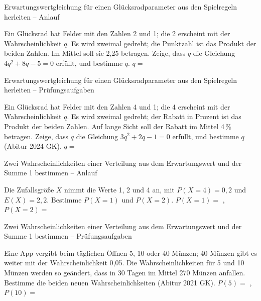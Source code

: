 \begin{aufgabe}{Erwartungswertgleichung für einen Glücksradparameter aus den Spielregeln herleiten – Anlauf}
\begin{teile}
\teil Ein Glücksrad hat Felder mit den Zahlen 2 und 1; die 2 erscheint mit der Wahrscheinlichkeit $q$. Es wird zweimal gedreht; die Punktzahl ist das Produkt der beiden Zahlen. Im Mittel soll sie 2{,}25 betragen. Zeige, dass $q$ die Gleichung $4q^2 + 8q - 5 = 0$ erfüllt, und bestimme $q$. $q = $ \leerfeld
\end{teile}
\end{aufgabe}

\begin{aufgabe}{Erwartungswertgleichung für einen Glücksradparameter aus den Spielregeln herleiten – Prüfungsaufgaben}
\begin{teile}
\teil Ein Glücksrad hat Felder mit den Zahlen 4 und 1; die 4 erscheint mit der Wahrscheinlichkeit $q$. Es wird zweimal gedreht; der Rabatt in Prozent ist das Produkt der beiden Zahlen. Auf lange Sicht soll der Rabatt im Mittel 4\,\% betragen. Zeige, dass $q$ die Gleichung $3q^2 + 2q - 1 = 0$ erfüllt, und bestimme $q$ \hfill (Abitur 2024 GK). $q = $ \leerfeld
\end{teile}
\end{aufgabe}

\begin{aufgabe}{Zwei Wahrscheinlichkeiten einer Verteilung aus dem Erwartungswert und der Summe 1 bestimmen – Anlauf}
\begin{teile}
\teil Die Zufallsgröße $X$ nimmt die Werte 1, 2 und 4 an, mit $P(X = 4) = 0{,}2$ und $E(X) = 2{,}2$. Bestimme $P(X = 1)$ und $P(X = 2)$. $P(X = 1) = $ \leerfeld , $P(X = 2) = $ \leerfeld
\end{teile}
\end{aufgabe}

\begin{aufgabe}{Zwei Wahrscheinlichkeiten einer Verteilung aus dem Erwartungswert und der Summe 1 bestimmen – Prüfungsaufgaben}
\begin{teile}
\teil Eine App vergibt beim täglichen Öffnen 5, 10 oder 40 Münzen; 40 Münzen gibt es weiter mit der Wahrscheinlichkeit 0{,}05. Die Wahrscheinlichkeiten für 5 und 10 Münzen werden so geändert, dass in 30 Tagen im Mittel 270 Münzen anfallen. Bestimme die beiden neuen Wahrscheinlichkeiten \hfill (Abitur 2021 GK). $P(5) = $ \leerfeld , $P(10) = $ \leerfeld
\end{teile}
\end{aufgabe}

